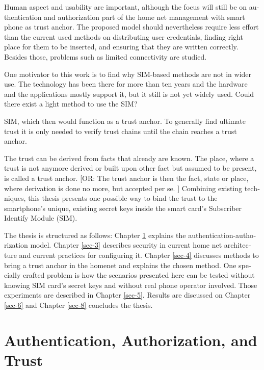\documentclass[12pt,a4paper,english]{tutthesis}
\begin{document}
\begin{otherlanguage}{english}
Human aspect and usability are important, although the focus will
still be on authentication and authorization part of the home net
management with smart phone as trust anchor.  The proposed model
should nevertheless require less effort than the current used methods
on distributing user credentials, finding right place for them to be
inserted, and ensuring that they are written correctly.
Besides those, problems such as limited connectivity are
studied.





One motivator to this work is to find why SIM-based methods are not in
wider use.  The technology has been there for more than ten years and
the hardware and the applications mostly support it, but it still is
not yet widely used.  Could there exist a light method to use the SIM?


SIM, which then would function as a trust anchor. To
generally find ultimate trust it is only needed to verify trust chains
until the chain reaches a trust anchor.


The trust can be derived from facts that already are known.  The
place, where a trust is not anymore derived or built upon other fact
but assumed to be present, is called a trust anchor.  [OR: The trust
anchor is then the fact, state or place, where derivation is done no
more, but accepted per se. ] Combining existing techniques, this
thesis presents one possible way to bind the trust to the smartphone's
unique, existing secret keys inside the smart card's Subscriber
Identify Module (SIM).






The thesis is structured as follows: Chapter \ref{sec-2} explains the
authentication-authorization model.  Chapter \ref{sec-3} describes
security in current home net architecture and current practices for
configuring it.  Chapter \ref{sec-4} discusses methods to bring a
trust anchor in the homenet and explains the chosen method.
One specially crafted problem is how the scenarios presented here can be
tested without knowing SIM card's secret keys and without real phone
operator involved.  Those experiments are described in Chapter
\ref{sec-5}.
Results are discussed on Chapter \ref{sec-6} and Chapter \ref{sec-8} concludes the
thesis.
\chapter{Authentication, Authorization, and Trust}
\label{sec-2}


\end{otherlanguage}
\end{document}
